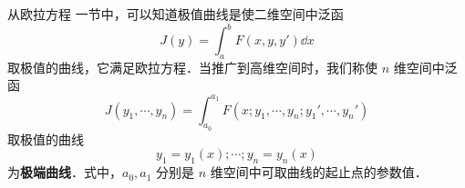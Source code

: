

从欧拉方程 一节中，可以知道极值曲线是使二维空间中泛函 
\begin{equation}
J(y)=\int_a^b F(x,y,y')\dd x
\end{equation}
取极值的曲线，它满足欧拉方程．当推广到高维空间时，我们称使 $n$ 维空间中泛函 
\begin{equation}
J(y_1,\cdots, y_n)=\int_{a_0}^{a_1}F(x;y_1,\cdots,y_n;y_1',\cdots,y_n') 
\end{equation}
取极值的曲线 
\begin{equation}
y_1=y_1(x);\cdots;y_n=y_n(x)
\end{equation}
为\textbf{极端曲线}．式中，$a_0,a_1$ 分别是 $n$ 维空间中可取曲线的起止点的参数值． 